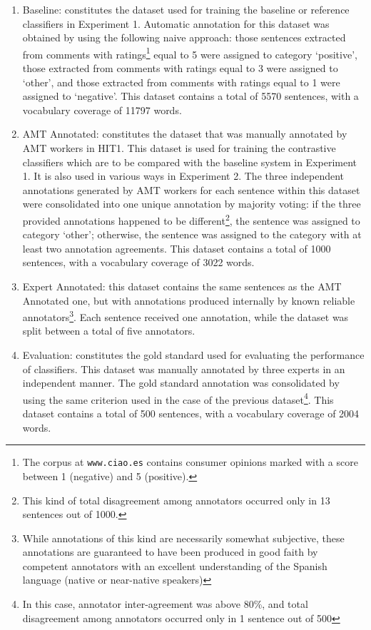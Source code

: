 \documentclass[11pt]{elsarticle}
\begin{document}
\begin{enumerate}
\item Baseline: constitutes the dataset used for training the baseline or reference classifiers in Experiment 1.
Automatic annotation for this dataset was obtained by using the following naive approach: those sentences extracted from
comments with ratings\footnote{The corpus at \texttt{www.ciao.es} contains consumer opinions marked with a score between 1 (negative) and 5 (positive).} equal to 5 were assigned to category `positive', those extracted from comments with ratings
equal to 3 were assigned to `other', and those extracted from comments with ratings equal to 1 were assigned to
`negative'. This dataset contains a total of 5570 sentences, with a vocabulary coverage of 11797 words.

\item AMT Annotated: constitutes the dataset that was manually annotated by AMT workers in HIT1.
This dataset is used for training the contrastive classifiers which are to be compared with the baseline system in Experiment 1. It is also used in various ways in Experiment 2.
The three independent annotations generated by AMT workers for each sentence within this dataset were consolidated into one unique annotation
by majority voting: if the three provided annotations happened to be
different\footnote{This kind of total disagreement among annotators occurred only in 13 sentences out of 1000.},
the sentence was assigned to category `other'; otherwise, the sentence was assigned to the category with
at least two annotation agreements. This dataset contains a total of 1000 sentences, with a vocabulary coverage
of 3022 words.

\item Expert Annotated: this dataset contains the same sentences as the AMT Annotated one, but with annotations produced internally by known reliable annotators\footnote{While annotations of this kind are necessarily somewhat subjective, these annotations are guaranteed to have been produced in good faith by competent annotators with an excellent understanding of the Spanish language (native or near-native speakers)}. Each sentence received one annotation, while the dataset was split between a total of five annotators.

\item Evaluation: constitutes the gold standard used for evaluating the performance of classifiers.
This dataset was manually annotated by three experts in an independent manner. The gold standard annotation
was consolidated by using the same criterion used in the case of the previous dataset\footnote{In this case,
annotator inter-agreement was above 80\%, and total disagreement among annotators occurred only in 1 sentence
out of 500}. This dataset contains a total of 500 sentences, with a vocabulary coverage of 2004 words.
\end{enumerate}
\end{document}
